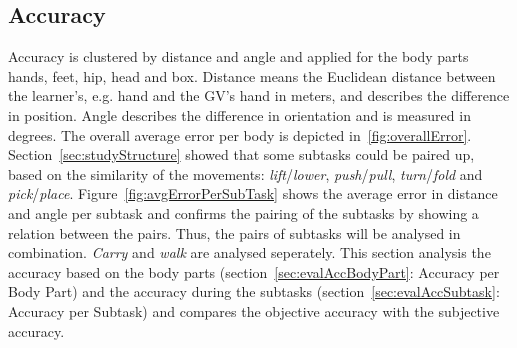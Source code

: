 \subsection{Accuracy}
Accuracy is clustered by distance and angle and applied for the body parts hands, feet, hip, head and box. Distance means the Euclidean distance between the learner's, e.g. hand and the GV's hand in meters, and describes the difference in position. Angle describes the difference in orientation and is measured in degrees. The overall average error per body is depicted in~\ref{fig:overallError}.\\
Section~\ref{sec:studyStructure} showed that some subtasks could be paired up, based on the similarity of the movements: \textit{lift}/\textit{lower}, \textit{push}/\textit{pull}, \textit{turn}/\textit{fold} and \textit{pick}/\textit{place}. Figure~\ref{fig:avgErrorPerSubTask} shows the average error in distance and angle per subtask and confirms the pairing of the subtasks by showing a relation between the pairs. Thus, the pairs of subtasks will be analysed in combination. \textit{Carry} and \textit{walk} are analysed seperately. This section analysis the accuracy based on the body parts (section~\ref{sec:evalAccBodyPart}: Accuracy per Body Part) and the accuracy during the subtasks (section~\ref{sec:evalAccSubtask}: Accuracy per Subtask) and compares the objective accuracy with the subjective accuracy.

